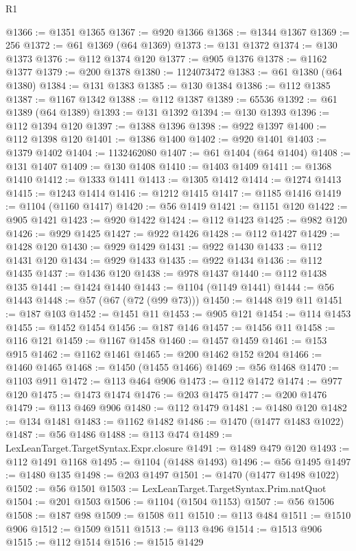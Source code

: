 \begin{lexlean}{R1}
\begin{coremodule}
@1366 := @1351 @1365
@1367 := @920 @1366
@1368 := @1344 @1367
@1369 := 256
@1372 := @61 @1369 (@64 @1369)
@1373 := @131 @1372
@1374 := @130 @1373
@1376 := @112 @1374 @120
@1377 := @905 @1376
@1378 := @1162 @1377
@1379 := @200 @1378
@1380 := 1124073472
@1383 := @61 @1380 (@64 @1380)
@1384 := @131 @1383
@1385 := @130 @1384
@1386 := @112 @1385
@1387 := @1167 @1342
@1388 := @112 @1387
@1389 := 65536
@1392 := @61 @1389 (@64 @1389)
@1393 := @131 @1392
@1394 := @130 @1393
@1396 := @112 @1394 @120
@1397 := @1388 @1396
@1398 := @922 @1397
@1400 := @112 @1398 @120
@1401 := @1386 @1400
@1402 := @920 @1401
@1403 := @1379 @1402
@1404 := 1132462080
@1407 := @61 @1404 (@64 @1404)
@1408 := @131 @1407
@1409 := @130 @1408
@1410 := @1403 @1409
@1411 := @1368 @1410
@1412 := @1333 @1411
@1413 := @1305 @1412
@1414 := @1274 @1413
@1415 := @1243 @1414
@1416 := @1212 @1415
@1417 := @1185 @1416
@1419 := @1104 (@1160 @1417)
@1420 := @56 @1419
@1421 := @1151 @120
@1422 := @905 @1421
@1423 := @920 @1422
@1424 := @112 @1423
@1425 := @982 @120
@1426 := @929 @1425
@1427 := @922 @1426
@1428 := @112 @1427
@1429 := @1428 @120
@1430 := @929 @1429
@1431 := @922 @1430
@1433 := @112 @1431 @120
@1434 := @929 @1433
@1435 := @922 @1434
@1436 := @112 @1435
@1437 := @1436 @120
@1438 := @978 @1437
@1440 := @112 @1438 @135
@1441 := @1424 @1440
@1443 := @1104 (@1149 @1441)
@1444 := @56 @1443
@1448 := @57 (@67 (@72 (@99 @73)))
@1450 := @1448 @19 @11
@1451 := @187 @103
@1452 := @1451 @11
@1453 := @905 @121
@1454 := @114 @1453
@1455 := @1452 @1454
@1456 := @187 @146
@1457 := @1456 @11
@1458 := @116 @121
@1459 := @1167 @1458
@1460 := @1457 @1459
@1461 := @153 @915
@1462 := @1162 @1461
@1465 := @200 @1462 @152 @204
@1466 := @1460 @1465
@1468 := @1450 (@1455 @1466)
@1469 := @56 @1468
@1470 := @1103 @911
@1472 := @113 @464 @906
@1473 := @112 @1472
@1474 := @977 @120
@1475 := @1473 @1474
@1476 := @203 @1475
@1477 := @200 @1476
@1479 := @113 @469 @906
@1480 := @112 @1479
@1481 := @1480 @120
@1482 := @134 @1481
@1483 := @1162 @1482
@1486 := @1470 (@1477 @1483 @1022)
@1487 := @56 @1486
@1488 := @113 @474
@1489 := LexLeanTarget.TargetSyntax.Expr.closure
@1491 := @1489 @479 @120
@1493 := @112 @1491 @1168
@1495 := @1104 (@1488 @1493)
@1496 := @56 @1495
@1497 := @1480 @135
@1498 := @203 @1497
@1501 := @1470 (@1477 @1498 @1022)
@1502 := @56 @1501
@1503 := LexLeanTarget.TargetSyntax.Prim.natQuot
@1504 := @201 @1503
@1506 := @1104 (@1504 @1153)
@1507 := @56 @1506
@1508 := @187 @98
@1509 := @1508 @11
@1510 := @113 @484
@1511 := @1510 @906
@1512 := @1509 @1511
@1513 := @113 @496
@1514 := @1513 @906
@1515 := @112 @1514
@1516 := @1515 @1429

\end{coremodule}
\end{lexlean}
